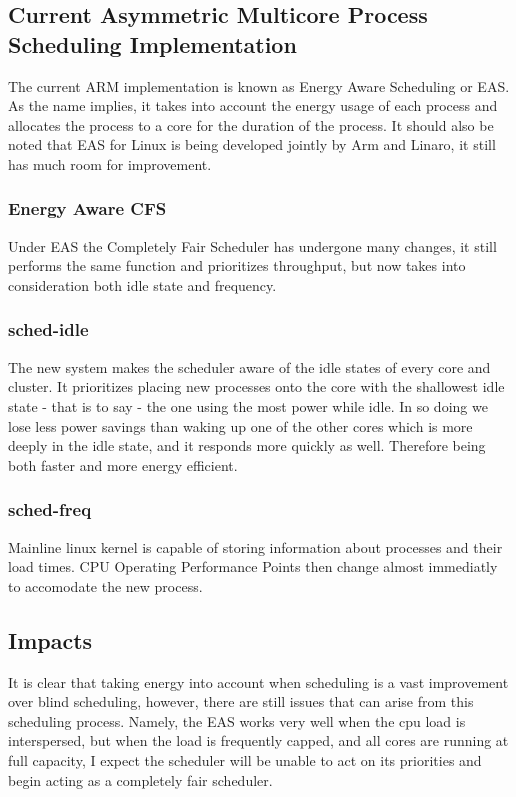 \subsection{Current Asymmetric Multicore Process Scheduling Implementation}
The current ARM implementation is known as Energy Aware Scheduling or EAS. As the name implies, it takes into account the energy usage of each process and allocates the process to a core for the duration of the process. It should also be noted that EAS for Linux is being developed jointly by Arm and Linaro, it still has much room for improvement.\cite{EASp2015}

\subsubsection{Energy Aware CFS}
Under EAS the Completely Fair Scheduler has undergone many changes, it still performs the same function and prioritizes throughput, but now takes into consideration both idle state and frequency. \cite{EASp2015}

\subsubsection{sched-idle}
The new system makes the scheduler aware of the idle states of every core and cluster. It prioritizes placing new processes onto the core with the shallowest idle state - that is to say - the one using the most power while idle. In so doing we lose less power savings than waking up one of the other cores which is more deeply in the idle state, and it responds more quickly as well. Therefore being both faster and more energy efficient. \cite{EASp2015}

\subsubsection{sched-freq}
Mainline linux kernel is capable of storing information about processes and their load times. CPU Operating Performance Points then change almost immediatly to accomodate the new process. \cite{EASp2015}

\subsection{Impacts}
It is clear that taking energy into account when scheduling is a vast improvement over blind scheduling, however, there are still issues that can arise from this scheduling process. Namely, the EAS works very well when the cpu load is interspersed, but when the load is frequently capped, and all cores are running at full capacity, I expect the scheduler will be unable to act on its priorities and begin acting as a completely fair scheduler.